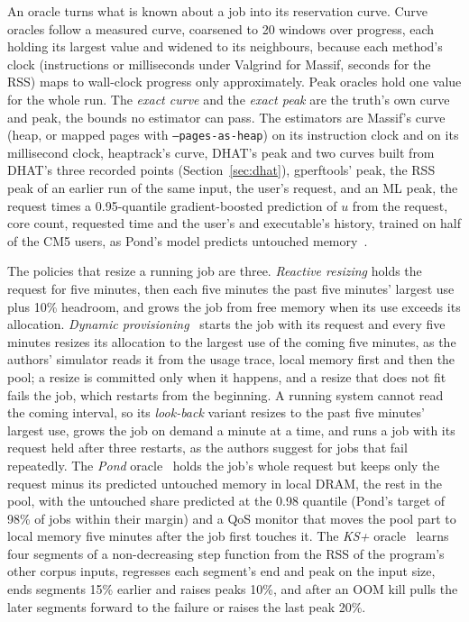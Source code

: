 \documentclass[11pt]{article}
\newcommand{\secref}[1]{Section~\ref{#1}}
\newcommand{\term}[1]{\emph{#1}}
\begin{document}
An oracle turns what is known about a job into its reservation curve. Curve oracles follow a measured curve, coarsened to
20 windows over progress, each holding its largest value and widened to its neighbours, because each method's clock
(instructions or milliseconds under Valgrind for Massif, seconds for the RSS) maps to wall-clock progress only
approximately. Peak oracles hold one value for the whole run. The \term{exact curve} and the \term{exact peak} are the
truth's own curve and peak, the bounds no estimator can pass. The estimators are Massif's curve (heap, or mapped pages
with \texttt{--pages-as-heap}) on its instruction clock and on its millisecond clock, heaptrack's curve, DHAT's peak and
two curves built from DHAT's three recorded points (\secref{sec:dhat}), gperftools' peak, the RSS peak of an earlier run
of the same input, the user's request, and an ML peak, the request times a 0.95-quantile gradient-boosted prediction of
$u$ from the request, core count, requested time and the user's and executable's history, trained on half of the CM5
users, as Pond's model predicts untouched memory~\cite{Li2023Pond}.

The policies that resize a running job are three. \term{Reactive resizing} holds the request for five minutes, then each
five minutes the past five minutes' largest use plus 10\% headroom, and grows the job from free memory when its use
exceeds its allocation. \term{Dynamic provisioning}~\cite{Zacarias2023Dynamic} starts the job with its request and every
five minutes resizes its allocation to the largest use of the coming five minutes, as the authors' simulator reads it from
the usage trace, local memory first and then the pool; a resize is committed only when it happens, and a resize that does
not fit fails the job, which restarts from the beginning. A running system cannot read the coming interval, so its
\term{look-back} variant resizes to the past five minutes' largest use, grows the job on demand a minute at a time, and
runs a job with its request held after three restarts, as the authors suggest for jobs that fail repeatedly. The
\term{Pond} oracle~\cite{Li2023Pond} holds the job's whole request but keeps only the request minus its predicted untouched
memory in local DRAM, the rest in the pool, with the untouched share predicted at the 0.98 quantile (Pond's target of 98\%
of jobs within their margin) and a QoS monitor that moves the pool part to local memory five minutes after the job first
touches it. The \term{KS+} oracle~\cite{KSplus2024} learns four segments of a non-decreasing step function from the RSS of
the program's other corpus inputs, regresses each segment's end and peak on the input size, ends segments 15\% earlier and
raises peaks 10\%, and after an OOM kill pulls the later segments forward to the failure or raises the last peak 20\%.
\end{document}
